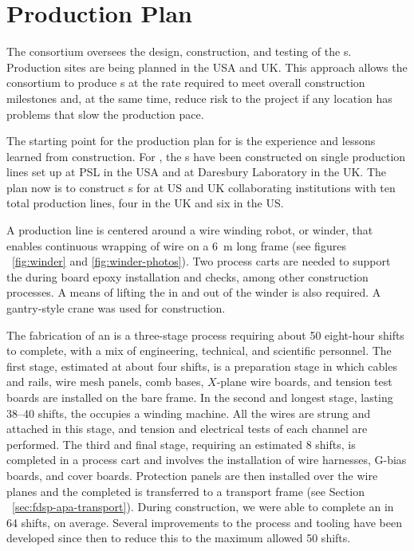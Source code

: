 \section{Production Plan}
\label{sec:fdsp-apa-prod}

The  consortium oversees the design, construction, and testing of the   s. Production sites are being planned in the USA and UK. This approach allows the consortium to produce s at the rate required to meet overall construction milestones and, at the same time, reduce risk to the project if any location has problems that slow the production pace.

The starting point for the  production plan for   is the experience and lessons learned from  construction. For , the s have been constructed on single production lines set up at PSL in the USA and at Daresbury Laboratory in the UK.  The plan now is to construct s for  at US and UK collaborating institutions with ten total production lines, four in the UK and six in the US.  

A production line is centered around a wire winding robot, or winder, that enables continuous wrapping of wire on a \SI{6}{m} long frame (see figures ~\ref{fig:winder} and \ref{fig:winder-photos}). 
Two process carts are needed to support the  during  board epoxy installation and  checks, among other construction processes. A means of lifting the  in and out of the winder is also required. A gantry-style crane was used for  construction.

The fabrication of an  is a  three-stage process requiring 
about \num{50} eight-hour shifts to complete, with a mix of engineering, technical, and scientific personnel.   The first stage, estimated at about four shifts, is a preparation stage in which   cables and rails, wire mesh panels, comb bases, $X$-plane wire boards, and tension test boards are installed on the bare  frame. In the second and longest stage, lasting \num{38}--\num{40} shifts, the  occupies a winding machine.  All the wires are strung and attached in this stage, and tension and electrical tests of each channel are performed.
The third and final stage, requiring an estimated \num{8} shifts, is completed in a process cart and involves the installation of wire harnesses, G-bias boards, and cover boards. 
Protection panels are then installed over the wire planes and the completed  is transferred to a transport frame (see Section ~\ref{sec:fdsp-apa-transport}).   During  construction, we were able to complete an  in \num{64} shifts, on average. Several improvements to the process and tooling have been developed since then to reduce this to the maximum allowed \num{50} shifts. 


